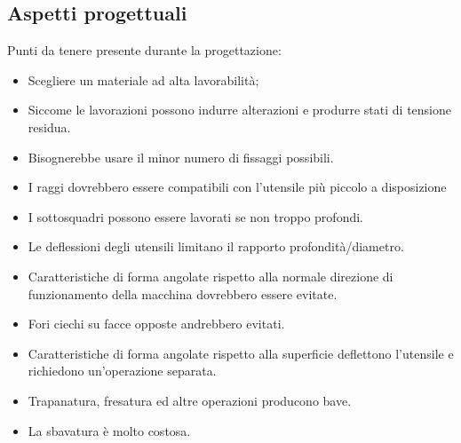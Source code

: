 \subsection{Aspetti progettuali}
Punti da tenere presente durante la progettazione:
\begin{itemize}
\item Scegliere un materiale ad alta lavorabilità;
\item Siccome le lavorazioni possono indurre alterazioni e produrre stati di tensione residua.
\item Bisognerebbe usare il minor numero di fissaggi possibili.
\item I raggi dovrebbero essere compatibili con l'utensile più piccolo a disposizione
\item I sottosquadri possono essere lavorati se non troppo profondi.
\item Le deflessioni degli utensili limitano il rapporto profondità/diametro.
\item Caratteristiche di forma angolate rispetto alla normale direzione di funzionamento della macchina dovrebbero essere evitate.
\item Fori ciechi su facce opposte andrebbero evitati.
\item Caratteristiche di forma angolate rispetto alla superficie deflettono l'utensile e richiedono un'operazione separata.
\item Trapanatura, fresatura ed altre operazioni producono bave.
\item La sbavatura è molto costosa.
\end{itemize}